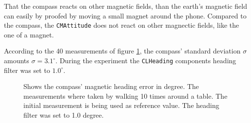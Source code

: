 That the compass reacts on other magnetic fields, than the earth's magnetic field can easily by proofed by moving a small magnet around the phone.
Compared to the compass, the \texttt{CMAttitude} does not react on other magnectic fields, like the one of a magnet.

According to the 40 measurements of figure \ref{fig:eval:compass}, the compass' standard deviation $\sigma$ amounts $\sigma = 3.1^{\circ}$.
During the experiment the \texttt{CLHeading} components heading filter was set to $1.0^{\circ}$.

\begin{figure}[htbp]

  \caption{Shows the compass' magnetic heading error in degree. The measurements where taken by walking 10 times around a table. The initial measurement is being used as reference value. The heading filter was set to 1.0 degree.}
  \label{fig:eval:compass}
\end{figure}


